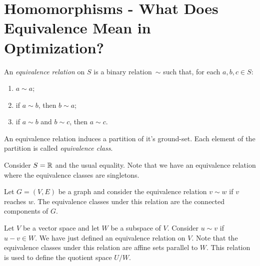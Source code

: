 \documentclass[a4paper]{article}
\begin{document}
\section*{Homomorphisms - What Does Equivalence Mean in Optimization?}


\begin{definition}
  An \emph{equivalence relation} on $S$ is a  binary relation~$\sim$ such that, for each $a,b,c\in S$:  
  \begin{enumerate}[label=(\roman*)]
  \item $a\sim a$;
  \item if $a \sim b$, then $b\sim a$;
  \item if $a\sim b$ and $b\sim c$, then $a\sim c$. 
  \end{enumerate}
\end{definition}

\begin{remark}
An equivalence relation induces a partition of it's ground-set. Each element of
the partition is called \emph{equivalence class}.  
\end{remark}

\begin{example}
  Consider \(S=\mathbb{R}\) and the usual equality. Note that we have an equivalence
  relation where the equivalence classes are singletons.
\end{example}

\begin{example}
  Let \(G=(V,E)\) be a graph and consider the equivalence relation \(v\sim w\)
  if \(v\) reaches \(w\). The equivalence classes under this relation are the connected components of \(G\). 
\end{example}

\begin{example}
  Let \(V\) be a vector space and let \(W\) be a subspace of \(V\). Consider
  \(u\sim v\) if \(u-v\in W\). We have just defined an equivalence relation on
  \(V\). Note that the equivalence classes under this relation are affine sets
  parallel to \(W\). This relation is used to define the quotient space \(U/W\).
\end{example}
\end{document}
